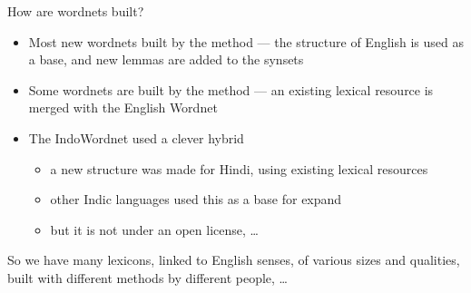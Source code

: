 \documentclass[xetex]{beamer}
\begin{document}


\begin{frame}{How are wordnets built?}

  \begin{itemize}
  \item Most new wordnets built by the  method --- the
    structure of English is used as a base, and new lemmas are added to the synsets
  \item Some wordnets are built by the  method --- an existing lexical resource is merged with the English Wordnet
  \item The IndoWordnet \citep{Bhattacharyya:2010} used a clever hybrid
    \begin{itemize}
    \item a new structure was made for Hindi, using existing lexical resources 
    \item other Indic languages used this as a base for expand 
    \item but it is not under an open license, \ldots
    \end{itemize}

  \end{itemize}
  
So we have many lexicons, linked to English senses, of various sizes and qualities, built with different methods by different people, \ldots
  
\end{frame}
\end{document}
